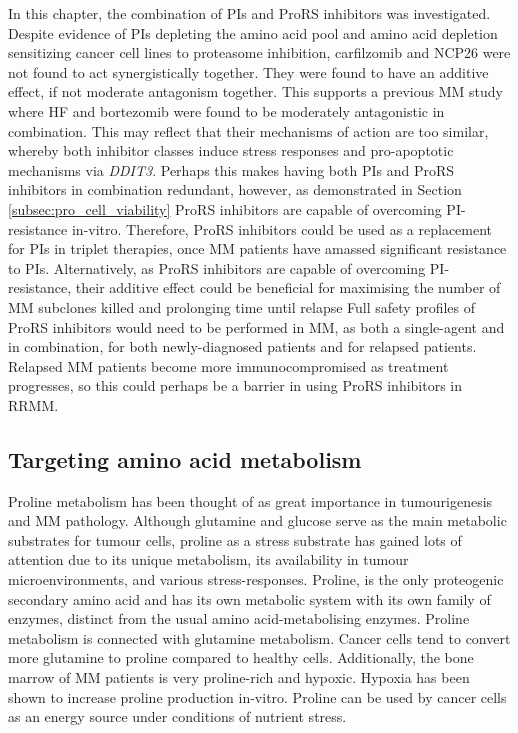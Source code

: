 In this chapter, the combination of PIs and ProRS inhibitors was investigated.
Despite evidence of PIs depleting the amino acid pool and amino acid depletion sensitizing cancer cell lines to proteasome inhibition\cite{suraweera2012failure, mizrachy2010amino}, carfilzomib and NCP26 were not found to act synergistically together.
They were found to have an additive effect, if not moderate antagonism together.
This supports a previous MM study where HF and bortezomib were found to be moderately antagonistic in combination\cite{leiba2012halofuginone}.
This may reflect that their mechanisms of action are too similar, whereby both inhibitor classes induce stress responses and pro-apoptotic mechanisms via \textit{DDIT3}.
Perhaps this makes having both PIs and ProRS inhibitors in combination redundant, however, as demonstrated in Section \ref{subsec:pro_cell_viability} ProRS inhibitors are capable of overcoming PI-resistance in-vitro.
Therefore, ProRS inhibitors could be used as a replacement for PIs in triplet therapies, once MM patients have amassed significant resistance to PIs.
Alternatively, as ProRS inhibitors are capable of overcoming PI-resistance, their additive effect could be beneficial for maximising the number of MM subclones killed and prolonging time until relapse
Full safety profiles of ProRS inhibitors would need to be performed in MM, as both a single-agent and in combination, for both newly-diagnosed patients and for relapsed patients.
Relapsed MM patients become more immunocompromised as treatment progresses, so this could perhaps be a barrier in using ProRS inhibitors in RRMM.

\subsection{Targeting amino acid metabolism}
Proline metabolism has been thought of as great importance in tumourigenesis and MM pathology\cite{d2020proline,liu2013mirna}.
Although glutamine and glucose serve as the main metabolic substrates for tumour cells, proline as a stress substrate has gained lots of attention due to its unique metabolism, its availability in tumour microenvironments, and various stress-responses\cite{liu2013mirna}.
Proline, is the only proteogenic secondary amino acid and has its own metabolic system with its own family of enzymes, distinct from the usual amino acid-metabolising enzymes\cite{liu2013mirna}.
Proline metabolism is connected with glutamine metabolism.
Cancer cells tend to convert more glutamine to proline compared to healthy cells.
Additionally, the bone marrow of MM patients is very proline-rich and hypoxic.
Hypoxia has been shown to increase proline production in-vitro.
Proline can be used by cancer cells as an energy source under conditions of nutrient stress\cite{phang2008metabolism}.

